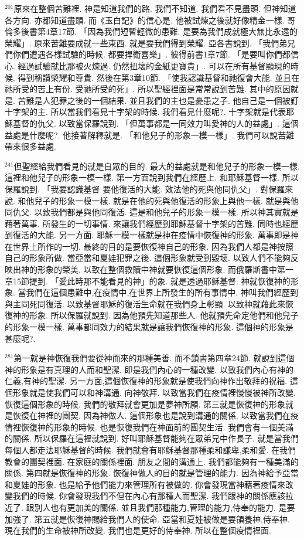 \documentclass{book}
\begin{document}
$^{201}$原來在整個苦難裡.
神是知道我們的路.
我們不知道.
我們看不見盡頭.
但神知道各方向.
亦都知道盡頭.
而《玉白記》的信心是.
他被試煉之後就好像精金一樣.
哥倫多後書第4章17節.
「因為我們短暫輕微的患難.
是要為我們成就極大無比永遠的榮耀」.
原來苦難要成就一些東西.
就是要我們得到榮耀.
亞各書說到.
「我們弟兄們你們遭遇各樣試驗的時候.
都要捍衛喜樂」.
彼得前書1章7節.
「是要叫你們都信心.
經過試驗就比那被火煉過.
仍然扭壞的金紙更寶貴」.
可以在所有基督顯現的時候.
得到稱讚榮耀和尊貴.
然後在第3章10節.
「使我認識基督和祂復會大能.
並且在祂所受的苦上有份.
受祂所受的死」.
所以聖經裡面是常常說到苦難.
其中的原因就是.
苦難是人犯罪之後的一個結果.
並且我們的主也是憂患之子.
他自己是一個被釘十字架的主.
所以當我們看見十字架的時候.
我們看見什麼呢?.
十字架就是代表耶穌基督的仇父.
以致當保羅說到.
「但萬事都是一同效力叫愛神的人的益處」.
這個益處是什麼呢?.
他接著解釋就是.
「和他兒子的形象一模一樣」.
我們可以說苦難帶來很多益處.

$^{241}$但聖經給我們看見的就是自眾的目的.
最大的益處就是和他兒子的形象一模一樣.
這裡和他兒子的形象一模一樣.
第一方面說到我們在經歷上.
和耶穌基督一樣.
所以保羅說到.
「我要認識基督 要他復活的大能.
效法他的死與他同仇父」.
對保羅來說.
和他兒子的形象一模一樣.
就是在他的死與他復活的形象上與他一樣.
就是與他同仇父.
以致我們都是與他同復活.
這是和他兒子的形象一模一樣.
所以神其實就是藉著萬事.
所發生的一切事情.
來讓我們經歷到耶穌基督十字架的苦難.
同時也經歷到復活的大能.
另一方面.
耶穌一模一樣就是神在疫情中恢復神的形象.
萬事即是神在世界上所作的一切.
最終的目的是要恢復神自己的形象.
因為我們人都是神按照自己的形象所做.
當亞當和夏娃犯罪之後.
這個形象就受到毀壞.
以致人們不能夠反映出神的形象的榮美.
以致在整個救贖中神就要恢復這個形象.
而俄羅斯書中第一章15節提到.
「愛此時那不能看見的神」的象.
就是透過耶穌基督.
神就恢復神的形象.
當我們在這個患難中,在疫情中,在世界上所發生的所有事情中.
神叫我們經歷到與主同死同復活.
以致基督耶穌的復活生命就在我們身上彰顯.
以致神就藉此來恢復神的形象.
所以保羅就說到.
因為他預先知道那些人.
他就預先命定他們和他兒子的形象一模一樣.
萬事都同效力的結果就是讓我們恢復神的形象.
這個神的形象是甚麼呢?.

$^{281}$第一就是神恢復我們要從神而來的那種美善.
而不鎖書第四章24節.
就說到這個神的形象是有真理的人而和聖潔.
即是我們內心的一種改變.
以致我們內心有神的仁義,有神的聖潔.
另一方面,這個恢復神的形象就是使我們向神作出敬拜的祝福.
這個形象就是使我們可以和神溝通.
向神敬拜.
以致當我們在疫情裡慢慢被神所改變.
恢復這個形象的時候.
我們的敬拜就會更加是夢神所願.
第三就是恢復神的形象就是恢復在神裡的團契.
因為神做人.
這個形象也是說到溝通的關係.
以致當我們在疫情裡恢復神的形象的時候.
也是恢復我們在神面前的團契生活.
我們會有一個美滿的關係.
所以保羅在這裡就說到.
好叫耶穌基督能夠在眾弟兄中作長子.
就是當我們每個人都走法耶穌基督的時候.
我們就會有耶穌基督那種柔和謙卑,柔和愛.
在我們教會的團契裡面.
在家庭的關係裡面.
朋友之間的溝通上.
我們都能夠有一種美滿的關係.
第四就是恢復神的形象.
恢復神做人的目的就是管理的能力.
因為神給予亞當和夏娃的形象.
也是給予他們能力來管理所有被做的.
你會發現當神藉著疫情來改變我們的時候.
你會發現我們不但在內心有那種人而聖潔.
我們跟神的關係應該拉近了.
跟別人也有更加美的關係.
並且我們那種能力,管理的能力,侍奉的能力.
是要加強了.
第五就是恢復神賜給我們人的使命.
亞當和夏娃被做是要領養神,侍奉神.
現在我們的生命被神所改變.
我們也是更好的侍奉神.
所以在整個疫情裡面.
\end{document}
